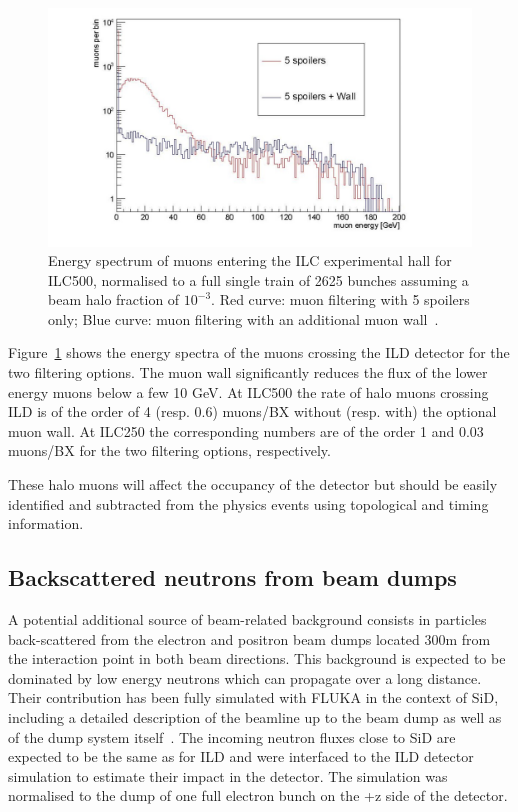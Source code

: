 \begin{figure}[t!]
\includegraphics[width=1.0\hsize]{Integration/fig/BG_muons.jpg}
\caption{\label{fig:integration:muons}Energy spectrum of muons entering the ILC experimental hall for ILC500, normalised to a full single train of 2625 bunches assuming a beam halo fraction of $10^{-3}$. Red curve: muon filtering with 5 spoilers only; Blue curve: muon filtering with an additional muon wall~\cite{ild:bib:schuetz_thesis}.}
\end{figure}

Figure~\ref{fig:integration:muons} shows the energy spectra of the muons crossing the ILD detector for the two filtering options. The muon wall significantly reduces the flux of the lower energy muons below a few 10 GeV. At ILC500 the rate of halo muons crossing ILD is of the order of 4 (resp. 0.6) muons/BX without (resp. with) the optional muon wall. At ILC250 the corresponding numbers are of the order 1 and 0.03 muons/BX for the two filtering options, respectively.

These halo muons will affect the occupancy of the detector but should be easily identified and subtracted from the physics events using topological and timing information.

\subsection{Backscattered neutrons from beam dumps}

A potential additional source of beam-related background consists in particles back-scattered from the electron and positron beam dumps located 300m from the interaction point in both beam directions. This background is expected to be dominated by low energy neutrons which can propagate over a long distance. Their contribution has been fully simulated with FLUKA in the context of SiD, including a detailed description of the beamline up to the beam dump as well as of the dump system itself~\cite{ild:bib:schuetz_thesis}. The incoming neutron fluxes close to SiD are expected to be the same as for ILD and were interfaced to the ILD detector simulation to estimate their impact in the detector. The simulation was normalised to the dump of one full electron bunch on the +z side of the detector.

